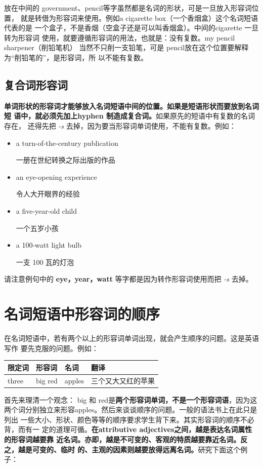 放在中间的 government、pencil等字虽然都是名词的形状，可是一旦放入形容词位置，
就是转借为形容词来使用。例如a cigarette box（一个香烟盒）这个名词短语代表的是
一个盒子，不是香烟（空盒子还是可以叫香烟盒）。中间的cigarette 一旦转为形容词
使用，就要遵循形容词的用法，也就是：没有复数。my pencil sharpener（削铅笔机）
当然不只削一支铅笔，可是 pencil放在这个位置要解释为“削铅笔的”，是形容词，所
以不能有复数。

\subsection{复合词形容词}

\textbf{单词形状的形容词才能够放入名词短语中间的位置。如果是短语形状而要放到名词短
  语中，就必须先加上hyphen 制造成复合词。}如果原先的短语中有复数的名词存在，
还得先把 \emph{-s} 去掉，因为要当形容词单词使用，不能有复数。例如：

\begin{itemize}
\item  a turn-of-the-century publication

  一册在世纪转换之际出版的作品
\item  an eye-opening experience

  令人大开眼界的经验
\item  a five-year-old child

  一个五岁小孩
\item  a 100-watt light bulb

  一支 100 瓦的灯泡
\end{itemize}

请注意例句中的 \textbf{eye，year，watt} 等字都是因为转作形容词使用而把 \emph{-s} 去掉。

\section{名词短语中形容词的顺序}

在名词短语中，若有两个以上的形容词单词出现，就会产生顺序的问题。这是英语写作
要先克服的问题。例如：

\begin{longtable}[]{@{}llll@{}}
  \toprule\noalign{}
  限定词 & 形容词 & 名词 & 翻译 \\
  \midrule\noalign{}
  \endhead
  \bottomrule\noalign{}
  \endlastfoot
  three & big red & apples & 三个又大又红的苹果 \\
\end{longtable}

首先来理清一个观念： big 和 red是\textbf{两个形容词单词，不是一个形容词语}，因为这
两个词分别独立来形容apples。然后来谈谈顺序的问题。一般的语法书上在此只是列出
一些大小、形状、颜色等等的顺序要求学生背下来。其实形容词的顺序不必背，而有一
定的道理可循。\textbf{在attributive adjectives之间，越是表达名词属性的形容词越要靠
  近名词。亦即，越是不可变的、客观的特质越要靠近名词。反之，越是可变的、临时
  的、主观的因素则越要放得远离名词。}研究下面这个例子：

